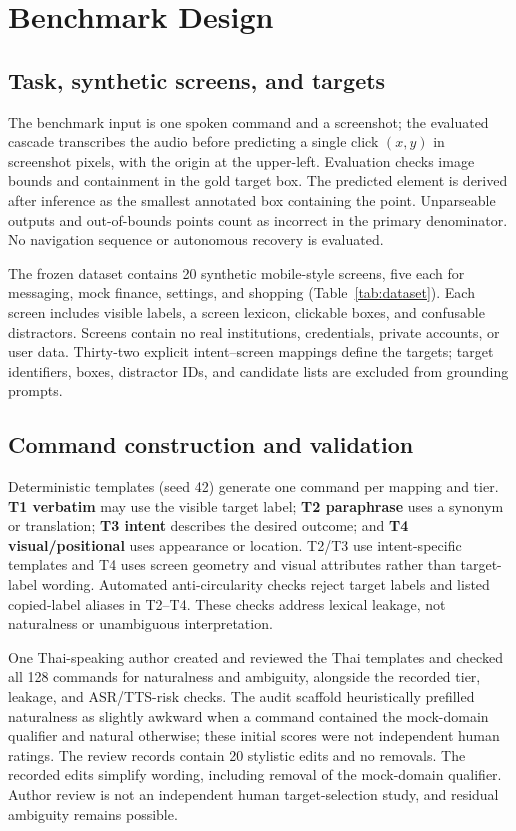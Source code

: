 \section{Benchmark Design}

\subsection{Task, synthetic screens, and targets}

The benchmark input is one spoken command and a screenshot; the evaluated cascade transcribes the audio before predicting a single click $(x,y)$ in screenshot pixels, with the origin at the upper-left. Evaluation checks image bounds and containment in the gold target box. The predicted element is derived after inference as the smallest annotated box containing the point. Unparseable outputs and out-of-bounds points count as incorrect in the primary denominator. No navigation sequence or autonomous recovery is evaluated.

The frozen dataset contains 20 synthetic mobile-style screens, five each for messaging, mock finance, settings, and shopping (Table~\ref{tab:dataset}). Each screen includes visible labels, a screen lexicon, clickable boxes, and confusable distractors. Screens contain no real institutions, credentials, private accounts, or user data. Thirty-two explicit intent--screen mappings define the targets; target identifiers, boxes, distractor IDs, and candidate lists are excluded from grounding prompts.



\subsection{Command construction and validation}

Deterministic templates (seed 42) generate one command per mapping and tier. \textbf{T1 verbatim} may use the visible target label; \textbf{T2 paraphrase} uses a synonym or translation; \textbf{T3 intent} describes the desired outcome; and \textbf{T4 visual/positional} uses appearance or location. T2/T3 use intent-specific templates and T4 uses screen geometry and visual attributes rather than target-label wording. Automated anti-circularity checks reject target labels and listed copied-label aliases in T2--T4. These checks address lexical leakage, not naturalness or unambiguous interpretation.

One Thai-speaking author created and reviewed the Thai templates and checked all 128 commands for naturalness and ambiguity, alongside the recorded tier, leakage, and ASR/TTS-risk checks. The audit scaffold heuristically prefilled naturalness as slightly awkward when a command contained the mock-domain qualifier and natural otherwise; these initial scores were not independent human ratings. The review records contain 20 stylistic edits and no removals. The recorded edits simplify wording, including removal of the mock-domain qualifier. Author review is not an independent human target-selection study, and residual ambiguity remains possible.

